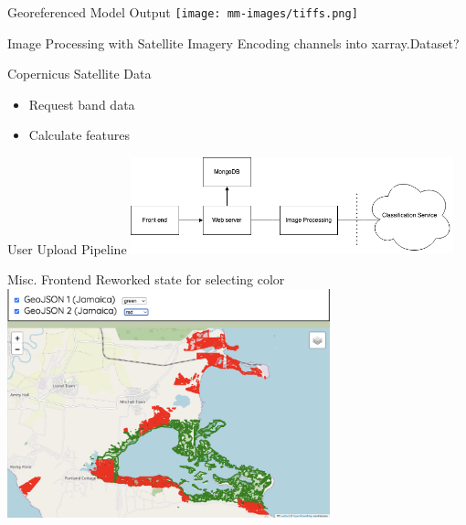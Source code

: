 \begin{frame}{Georeferenced Model Output}
    \centering
    \texttt{[image: mm-images/tiffs.png]}
\end{frame}

\begin{frame}{Image Processing with Satellite Imagery}
    Encoding channels into xarray.Dataset?  
\end{frame}

\begin{frame}{Copernicus Satellite Data}
    \begin{itemize}
        \item Request band data
        \item Calculate features
    \end{itemize}    
\end{frame}

\begin{frame}{User Upload Pipeline}
    \centering
    \includegraphics[height=0.7\textheight,width=0.7\textwidth,keepaspectratio]{mm-images/mongo-in-components.png}
\end{frame}

\begin{frame}{Misc. Frontend}
    Reworked state for selecting color
    \centering
    \includegraphics[height=0.7\textheight,width=0.7\textwidth,keepaspectratio]{mm-images/geojson-colors.png}
\end{frame}
